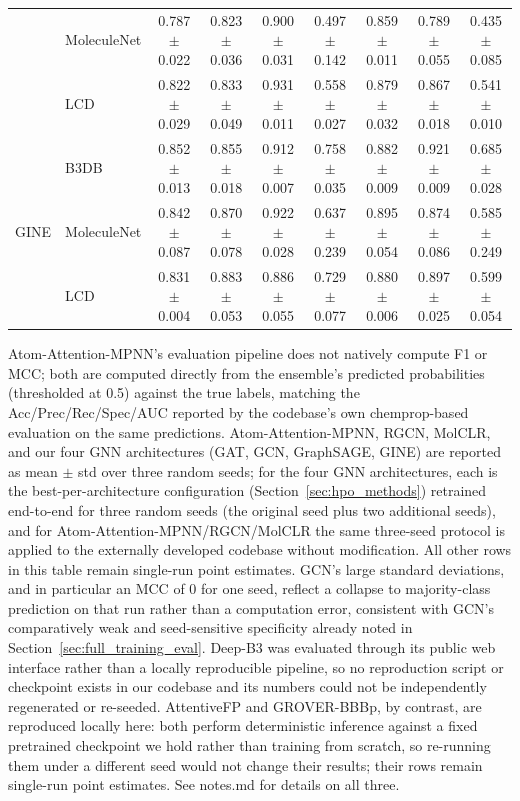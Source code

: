 \documentclass[conference]{IEEEtran}
\begin{document}
\begin{table}[htbp]
\begin{tabular}{llccccccc}
    & MoleculeNet & 0.787$\pm$0.022 & 0.823$\pm$0.036 & 0.900$\pm$0.031 & 0.497$\pm$0.142 & 0.859$\pm$0.011 & 0.789$\pm$0.055 & 0.435$\pm$0.085 \\
    & LCD         & 0.822$\pm$0.029 & 0.833$\pm$0.049 & 0.931$\pm$0.011 & 0.558$\pm$0.027 & 0.879$\pm$0.032 & 0.867$\pm$0.018 & 0.541$\pm$0.010 \\
\hline
\multirow{3}{*}{GINE}
    & B3DB        & 0.852$\pm$0.013 & 0.855$\pm$0.018 & 0.912$\pm$0.007 & 0.758$\pm$0.035 & 0.882$\pm$0.009 & 0.921$\pm$0.009 & 0.685$\pm$0.028 \\
    & MoleculeNet & 0.842$\pm$0.087 & 0.870$\pm$0.078 & 0.922$\pm$0.028 & 0.637$\pm$0.239 & 0.895$\pm$0.054 & 0.874$\pm$0.086 & 0.585$\pm$0.249 \\
    & LCD         & 0.831$\pm$0.004 & 0.883$\pm$0.053 & 0.886$\pm$0.055 & 0.729$\pm$0.077 & 0.880$\pm$0.006 & 0.897$\pm$0.025 & 0.599$\pm$0.054 \\
\hline
\end{tabular}

\vspace{2pt}
{\footnotesize Atom-Attention-MPNN's evaluation pipeline does not
natively compute F1 or MCC; both are computed directly from the
ensemble's predicted probabilities (thresholded at 0.5) against the
true labels, matching the Acc/Prec/Rec/Spec/AUC reported by the
codebase's own chemprop-based evaluation on the same predictions.
Atom-Attention-MPNN, RGCN, MolCLR, and
our four GNN architectures (GAT, GCN, GraphSAGE, GINE) are reported as
mean $\pm$ std over three random seeds; for the four GNN architectures,
each is the best-per-architecture configuration
(Section~\ref{sec:hpo_methods}) retrained end-to-end for three random
seeds (the original seed plus two additional seeds), and for
Atom-Attention-MPNN/RGCN/MolCLR the same three-seed protocol is applied
to the externally developed codebase without modification. All other
rows in this table remain single-run point estimates. GCN's large
standard deviations, and in particular an MCC of 0 for one seed,
reflect a collapse to majority-class prediction on that run rather
than a computation error, consistent with GCN's comparatively weak and
seed-sensitive specificity already noted in Section~\ref{sec:full_training_eval}.
Deep-B3 was evaluated through its public web interface rather than a
locally reproducible pipeline, so no reproduction script or checkpoint
exists in our codebase and its numbers could not be independently
regenerated or re-seeded. AttentiveFP and GROVER-BBBp, by contrast, are
reproduced locally here: both perform deterministic inference against a
fixed pretrained checkpoint we hold rather than training from
scratch, so re-running them under a different seed would not change their
results; their rows remain single-run point estimates. See notes.md for
details on all three.}
\end{table}
\end{document}
